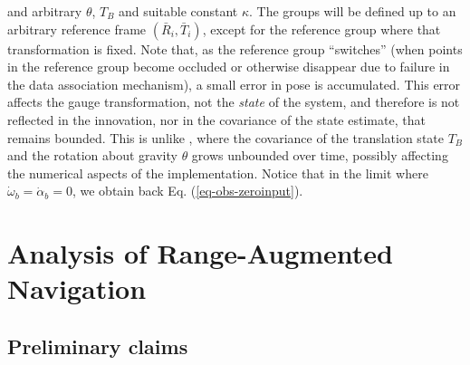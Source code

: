 \documentclass[]{article}
\def\w{\omega}
\begin{document}
and arbitrary $\theta$, $T_B$ and suitable constant $\kappa$. The groups will be defined up to an arbitrary reference frame $(\bar R_i, \bar T_i)$, except for the reference group where that transformation is fixed. Note that, as the reference group ``switches'' (when points in the reference group become occluded or otherwise disappear due to failure in the data association mechanism), a small error in pose is accumulated. This error affects the gauge transformation, not the {\em state} of the system, and therefore is not reflected in the innovation, nor in the covariance of the state estimate, that remains bounded. This is unlike \cite{roumeliotisM}, where the covariance of the translation state $T_B$ and the rotation about gravity $\theta$ grows unbounded over time, possibly affecting the numerical aspects of the implementation. Notice that in the limit where $\dot \w_b = \dot \alpha_b =0$, we obtain back Eq. (\ref{eq-obs-zeroinput}).

\section{Analysis of Range-Augmented Navigation}


\subsection{Preliminary claims}

 
\end{document}

